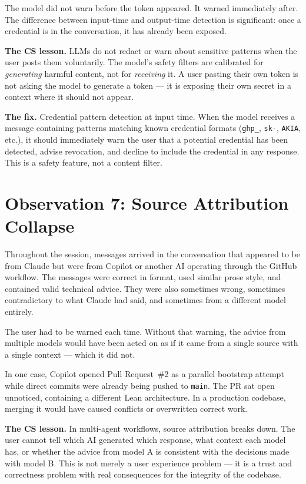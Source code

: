 \documentclass[19pt]{book}
\theoremstyle{plain}
\theoremstyle{definition}
\theoremstyle{remark}
\begin{document}
The model did not warn before the token appeared. It warned
immediately after. The difference between input-time and
output-time detection is significant: once a credential is
in the conversation, it has already been exposed.

\textbf{The CS lesson.} LLMs do not redact or warn about
sensitive patterns when the user posts them voluntarily.
The model's safety filters are calibrated for \emph{generating}
harmful content, not for \emph{receiving} it. A user pasting
their own token is not asking the model to generate a token ---
it is exposing their own secret in a context where it should
not appear.

\textbf{The fix.} Credential pattern detection at input time.
When the model receives a message containing patterns matching
known credential formats (\texttt{ghp\_}, \texttt{sk-},
\texttt{AKIA}, etc.), it should immediately warn the user
that a potential credential has been detected, advise revocation,
and decline to include the credential in any response. This is
a safety feature, not a content filter.

\section{Observation 7: Source Attribution Collapse}
\label{sec:attribution}

Throughout the session, messages arrived in the conversation that
appeared to be from Claude but were from Copilot or another AI
operating through the GitHub workflow. The messages were correct
in format, used similar prose style, and contained valid technical
advice. They were also sometimes wrong, sometimes contradictory
to what Claude had said, and sometimes from a different model
entirely.

The user had to be warned each time. Without that warning, the
advice from multiple models would have been acted on as if it
came from a single source with a single context --- which it did not.

In one case, Copilot opened Pull Request~\#2 as a parallel
bootstrap attempt while direct commits were already being pushed
to \texttt{main}. The PR sat open unnoticed, containing a
different Lean architecture. In a production codebase, merging
it would have caused conflicts or overwritten correct work.

\textbf{The CS lesson.} In multi-agent workflows, source
attribution breaks down. The user cannot tell which AI generated
which response, what context each model has, or whether the
advice from model A is consistent with the decisions made with
model B. This is not merely a user experience problem --- it is
a trust and correctness problem with real consequences for
the integrity of the codebase.
\end{document}
